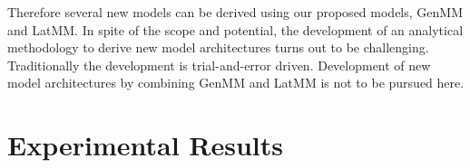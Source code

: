 Therefore several new models can be derived using our proposed models, GenMM and LatMM. In spite of the scope and potential, the development of an analytical methodology to derive new model architectures turns out to be challenging. Traditionally the development is trial-and-error driven. Development of new model architectures by combining GenMM and LatMM is not to be pursued here.   


\section{Experimental Results}\label{sec:experiments}
